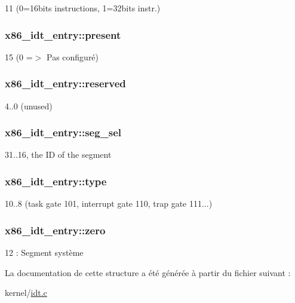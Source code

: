 11 (0=16bits instructions, 1=32bits instr.) \hypertarget{structx86__idt__entry_aad5f9c737cf3c83abf7f5561acaa0891}{
\subsubsection[{present}]{ {\bf x86\-\_\-idt\-\_\-entry\-::present}}}\label{structx86__idt__entry_aad5f9c737cf3c83abf7f5561acaa0891}
15 (0 =$>$ \-Pas configuré) \hypertarget{structx86__idt__entry_adb99b161a27397d74e715d962b1c65fa}{
\subsubsection[{reserved}]{ {\bf x86\-\_\-idt\-\_\-entry\-::reserved}}}\label{structx86__idt__entry_adb99b161a27397d74e715d962b1c65fa}
4..0 (unused) \hypertarget{structx86__idt__entry_a47f891095976b78c547b428be1b91c87}{
\subsubsection[{seg\-\_\-sel}]{ {\bf x86\-\_\-idt\-\_\-entry\-::seg\-\_\-sel}}}\label{structx86__idt__entry_a47f891095976b78c547b428be1b91c87}
31..16, the \-I\-D of the segment \hypertarget{structx86__idt__entry_a826ef1aafc2352576ec3493747b964f5}{
\subsubsection[{type}]{ {\bf x86\-\_\-idt\-\_\-entry\-::type}}}\label{structx86__idt__entry_a826ef1aafc2352576ec3493747b964f5}
10..8 (task gate 101, interrupt gate 110, trap gate 111...) \hypertarget{structx86__idt__entry_ac291c67a44d2457bda76146d1bc5e920}{
\subsubsection[{zero}]{ {\bf x86\-\_\-idt\-\_\-entry\-::zero}}}\label{structx86__idt__entry_ac291c67a44d2457bda76146d1bc5e920}
12 \-: \-Segment système 

\-La documentation de cette structure a été générée à partir du fichier suivant \-:\begin{DoxyCompactItemize}
\item 
kernel/\hyperlink{idt_8c}{idt.\-c}\end{DoxyCompactItemize}
